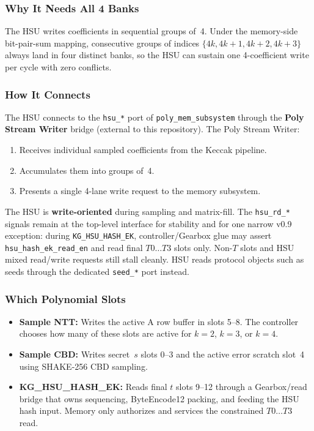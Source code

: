 \documentclass[11pt,letterpaper]{article}
\begin{document}
\subsubsection{Why It Needs All 4 Banks}

The HSU writes coefficients in sequential groups of~4. Under the memory-side
bit-pair-sum mapping, consecutive groups of indices
$\{4k, 4k{+}1, 4k{+}2, 4k{+}3\}$ always land in four distinct banks,
so the HSU can sustain one 4-coefficient write per cycle with zero
conflicts.

\subsubsection{How It Connects}

The HSU connects to the \texttt{hsu\_*} port of
\texttt{poly\_mem\_subsystem} through the \textbf{Poly Stream Writer}
bridge (external to this repository). The Poly Stream Writer:

\begin{enumerate}
  \item Receives individual sampled coefficients from the Keccak
    pipeline.
  \item Accumulates them into groups of~4.
  \item Presents a single 4-lane write request to the memory subsystem.
\end{enumerate}

The HSU is \textbf{write-oriented} during sampling and matrix-fill. The
\texttt{hsu\_rd\_*} signals remain at the top-level interface for stability
and for one narrow v0.9 exception: during \texttt{KG\_HSU\_HASH\_EK},
controller/Gearbox glue may assert \texttt{hsu\_hash\_ek\_read\_en} and
read final $T0\ldots T3$ slots only. Non-$T$ slots and HSU mixed read/write
requests still stall cleanly. HSU reads protocol objects such as seeds
through the dedicated \texttt{seed\_*} port instead.

\subsubsection{Which Polynomial Slots}

\begin{itemize}
  \item \textbf{Sample NTT:} Writes the active A row buffer in slots
    5--8. The controller chooses how many of these slots are active for
    $k=2$, $k=3$, or $k=4$.
  \item \textbf{Sample CBD:} Writes secret~$s$ slots 0--3 and the active
    error scratch slot~4 using SHAKE-256 CBD sampling.
  \item \textbf{KG\_HSU\_HASH\_EK:} Reads final $t$ slots 9--12 through a
    Gearbox/read bridge that owns sequencing, ByteEncode12 packing, and
    feeding the HSU hash input. Memory only authorizes and services the
    constrained $T0\ldots T3$ read.
\end{itemize}
\end{document}
